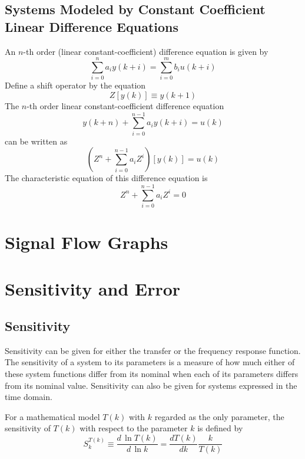 \documentclass[11pt]{book}
\begin{document}
\subsection{Systems Modeled by Constant Coefficient Linear Difference Equations}

An $n$-th order (linear constant-coefficient) difference equation is given by
\begin{equation}
	\sum_{i=0}^n{a_iy(k+i)}=\sum_{i=0}^m{b_iu(k+i)}
\end{equation}
Define a shift operator by the equation
\begin{equation}
	Z[y(k)]\equiv{y(k+1)}
\end{equation}
The $n$-th order linear constant-coefficient difference equation
\begin{equation}
	y(k+n)+\sum_{i=0}^{n-1}{a_iy(k+i)}=u(k)
\end{equation}
can be written as
\begin{equation}
	(Z^n+\sum_{i=0}^{n-1}{a_iZ^i})[y(k)]=u(k)
\end{equation}
The characteristic equation of this difference equation is
\begin{equation}
	Z^n+\sum_{i=0}^{n-1}{a_iZ^i}=0
\end{equation}

\section{Signal Flow Graphs}

\section{Sensitivity and Error}

\subsection{Sensitivity}

Sensitivity can be given for either the transfer or the frequency response function. The sensitivity of a system to its parameters is a measure of how much either of these system functions differ from its nominal when each of its parameters differs from its nominal value. Sensitivity can also be given for systems expressed in the time domain.

For a mathematical model $T(k)$ with $k$ regarded as the only parameter, the sensitivity of $T(k)$ with respect to the parameter $k$ is defined by
\begin{equation}
	S_k^{T(k)}\equiv\frac{d\,\ln{T(k)}}{d\,\ln{k}}=\frac{dT(k)}{dk}\frac{k}{T(k)}
\end{equation}
\end{document}
